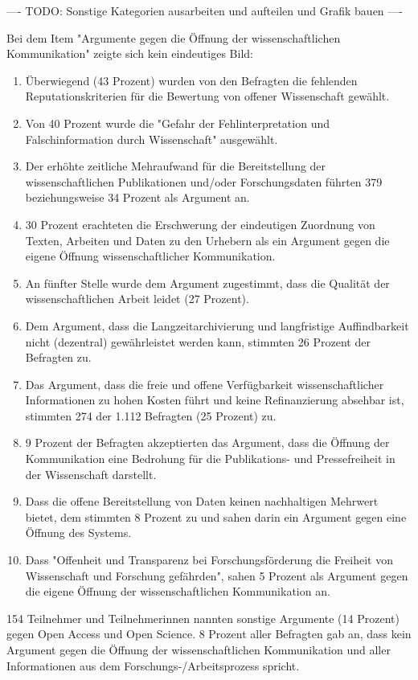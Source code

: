 ---- TODO: Sonstige Kategorien ausarbeiten und aufteilen und Grafik bauen ----

Bei dem Item "Argumente gegen die Öffnung der wissenschaftlichen Kommunikation" zeigte sich kein eindeutiges Bild:
\begin{enumerate}
\item Überwiegend (43 Prozent) wurden von den Befragten die fehlenden Reputationskriterien für die Bewertung von offener Wissenschaft gewählt.
\item Von 40 Prozent wurde die "Gefahr der Fehlinterpretation und Falschinformation durch Wissenschaft" ausgewählt.
\item Der erhöhte zeitliche Mehraufwand für die Bereitstellung der wissenschaftlichen Publikationen und/oder Forschungsdaten führten 379 beziehungsweise 34 Prozent als Argument an.
\item 30 Prozent erachteten die Erschwerung der eindeutigen Zuordnung von Texten, Arbeiten und Daten zu den Urhebern als ein Argument gegen die eigene Öffnung wissenschaftlicher Kommunikation.
\item An fünfter Stelle wurde dem Argument zugestimmt, dass die Qualität der wissenschaftlichen Arbeit leidet (27 Prozent).
\item Dem Argument, dass die Langzeitarchivierung und langfristige Auffindbarkeit nicht (dezentral) gewährleistet werden kann, stimmten 26 Prozent der Befragten zu.
\item Das Argument, dass die freie und offene Verfügbarkeit wissenschaftlicher Informationen zu hohen Kosten führt und keine Refinanzierung absehbar ist, stimmten 274 der 1.112 Befragten (25 Prozent) zu.
\item 9 Prozent der Befragten akzeptierten das Argument, dass die Öffnung der Kommunikation eine Bedrohung für die Publikations- und Pressefreiheit in der Wissenschaft darstellt.
\item Dass die offene Bereitstellung von Daten keinen nachhaltigen Mehrwert bietet, dem stimmten 8 Prozent zu und sahen darin ein Argument gegen eine Öffnung des Systems.
\item Dass "Offenheit und Transparenz bei Forschungsförderung die Freiheit von Wissenschaft und Forschung gefährden", sahen 5 Prozent als Argument gegen die eigene Öffnung der wissenschaftlichen Kommunikation an.
\end{enumerate}

154 Teilnehmer und Teilnehmerinnen nannten sonstige Argumente (14 Prozent) gegen Open Access und Open Science. 8 Prozent aller Befragten gab an, dass kein Argument gegen die Öffnung der wissenschaftlichen Kommunikation und aller Informationen aus dem Forschungs-/Arbeitsprozess spricht.

